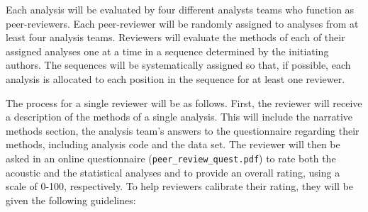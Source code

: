 \documentclass[Review,times,sageh]{sagej}
\begin{document}
Each analysis will be evaluated by four different analysts teams who
function as peer-reviewers. Each peer-reviewer will be randomly assigned
to analyses from at least four analysis teams. Reviewers will evaluate
the methods of each of their assigned analyses one at a time in a
sequence determined by the initiating authors. The sequences will be
systematically assigned so that, if possible, each analysis is allocated
to each position in the sequence for at least one reviewer.

The process for a single reviewer will be as follows. First, the
reviewer will receive a description of the methods of a single analysis.
This will include the narrative methods section, the analysis team's
answers to the questionnaire regarding their methods, including analysis
code and the data set. The reviewer will then be asked in an online
questionnaire (\texttt{peer\_review\_quest.pdf}) to rate both the
acoustic and the statistical analyses and to provide an overall rating,
using a scale of 0-100, respectively. To help reviewers calibrate their
rating, they will be given the following guidelines:
\end{document}
